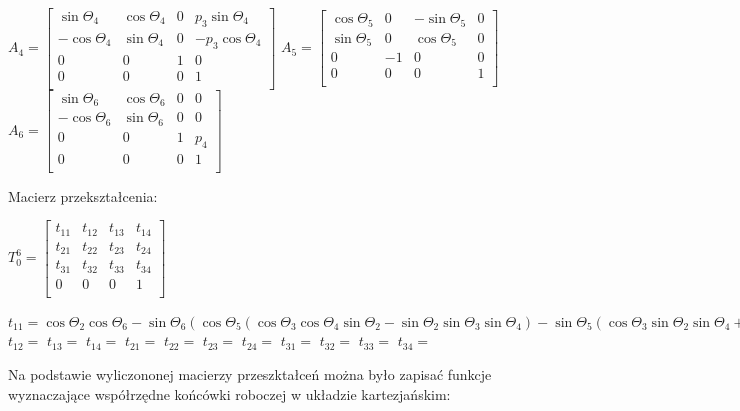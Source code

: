 $A_4 = 
\begin{bmatrix}
\sin \Theta_4 		& \cos \Theta_4	& 0 		& p_3\sin \Theta_4 	\\
-\cos \Theta_4	& \sin \Theta_4 	& 0 		& -p_3\cos \Theta_4 	\\
0 				& 0 				& 1 		& 0 					\\
0 				& 0 				& 0 		& 1 					\\
\end{bmatrix}$
$A_5 = 
\begin{bmatrix}
\cos \Theta_5		& 0 		& -\sin \Theta_5	 & 0 		\\
\sin \Theta_5	 	& 0 		& \cos \Theta_5 	& 0 		\\
0 				& -1 	& 0 				& 0 		\\
0 				& 0 		& 0 				& 1 		\\
\end{bmatrix}$
$A_6 = 
\begin{bmatrix}
\sin \Theta_6	 	& \cos \Theta_6	& 0 		& 0 		\\
-\cos \Theta_6	& \sin \Theta_6	& 0 		& 0 		\\
0 				& 0 				& 1 		& p_4	\\
0 				& 0 				& 0 		& 1 		\\
\end{bmatrix}$

\vspace{5 mm}

Macierz przekształcenia:

$T_0^6=
\begin{bmatrix}
t_{11}		& t_{12}	& t_{13}	& t_{14}	\\
t_{21}		& t_{22}	& t_{23}	& t_{24}	\\
t_{31}		& t_{32}	& t_{33}	& t_{34}	\\
0		& 0		& 0		& 1	\\
\end{bmatrix}$

\vspace{5 mm}

$t_{11} = \cos \Theta_2 \cos \Theta_6 - \sin \Theta_6 (\cos \Theta_5 (\cos \Theta_3 \cos \Theta_4 \sin \Theta_2 - \sin \Theta_2 \sin \Theta_3 \sin \Theta_4) - \sin \Theta_5 (\cos \Theta_3 \sin \Theta_2 \sin \Theta_4 + \cos \Theta_4 \sin \Theta_2 \sin \Theta_3))$
$t_{12} = $
$t_{13} = $
$t_{14} = $
$t_{21} = $
$t_{22} = $
$t_{23} = $
$t_{24} = $
$t_{31} = $
$t_{32} = $
$t_{33} = $
$t_{34} = $

Na podstawie wyliczononej macierzy przeszktałceń można było zapisać funkcje wyznaczające współrzędne końcówki roboczej w układzie kartezjańskim:

